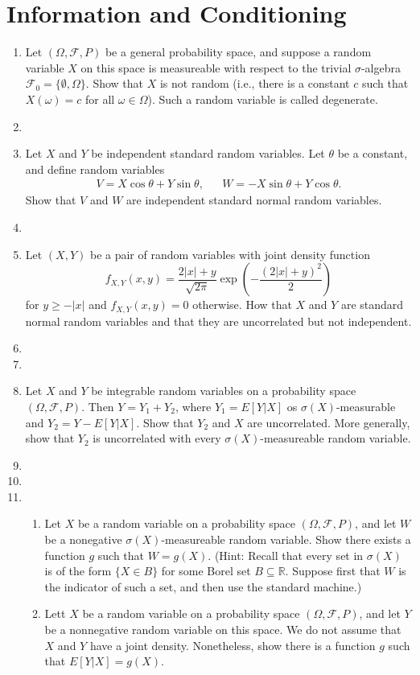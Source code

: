 \documentclass{article}
\newcommand{\F}{\mathcal{F}}
\begin{document}
\section{Information and Conditioning}
\begin{enumerate}
	\item Let $(\Omega, \F, P)$ be a general probability space, and suppose a random variable $X$ on this space is measureable with respect to the trivial $\sigma$-algebra $\mathcal{F}_0 = \{\emptyset, \Omega\}$. Show that $X$ is not random (i.e., there is a constant $c$ such that $X(\omega) = c$ for all $\omega \in \Omega$). Such a random variable is called degenerate.
	\item
	\item Let $X$ and $Y$ be independent standard random variables. Let $\theta$ be a constant, and define random variables
	$$
	\begin{aligned}
	V = X \cos \theta + Y \sin \theta,&& W = -X \sin \theta + Y \cos \theta.
	\end{aligned}
	$$
	Show that $V$ and $W$ are independent standard normal random variables.
	\item 
	\item Let $(X, Y)$ be a pair of random variables with joint density function
	$$
	f_{X, Y}(x, y) = \frac{2 |x| + y}{\sqrt{2\pi}}\exp\left( - \frac{(2|x| + y)^2}{2} \right)
	$$
	for $y \geq -|x|$ and $f_{X, Y}(x, y) = 0$ otherwise. How that $X$ and $Y$ are standard normal random variables and that they are uncorrelated but not independent.
	\item 
	\item
	\item Let $X$ and $Y$ be integrable random variables on a probability space $(\Omega, \F, P)$. Then $Y = Y_1 + Y_2$, where $Y_1 = E[Y|X]$ os $\sigma(X)$-measurable and $Y_2 = Y - E[Y|X]$. Show that $Y_2$ and $X$ are uncorrelated. More generally, show that $Y_2$ is uncorrelated with every $\sigma(X)$-measureable random variable.
	\item
	\item
	\item
		\begin{enumerate}
			\item Let $X$ be a random variable on a probability space $(\Omega, \F, P)$, and let $W$ be a nonegative $\sigma(X)$-measureable random variable. Show there exists a function $g$ such that $W = g(X)$. (Hint: Recall that every set in $\sigma(X)$ is of the form $\{X \in B\}$ for some Borel set $B \subseteq \mathbb{R}$. Suppose first that $W$ is the indicator of such a set, and then use the standard machine.)
			\item Lett $X$ be a random variable on a probability space $(\Omega, \F, P)$, and let $Y$ be a nonnegative random variable on this space. We do not assume that $X$ and $Y$ have a joint density. Nonetheless, show there is a function $g$ such that $E[Y|X] = g(X)$.
		\end{enumerate}
\end{enumerate}
\end{document}
